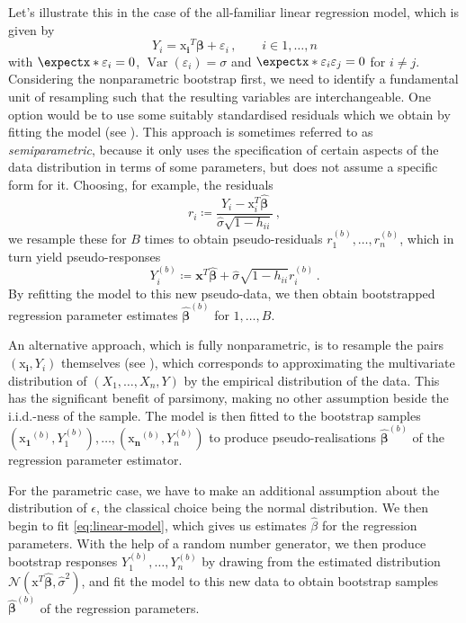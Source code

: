 \documentclass[a4paper]{book}
\begin{document}
Let's illustrate this in the case of the all-familiar linear regression model, which is given by
\begin{equation} \label{eq:linear-model}
    Y_i = \bm{\mathrm{x}_i}^T \bm{\beta} + \varepsilon_i \,, \qquad i \in {1, \dots, n}
\end{equation}
with $\expect{\varepsilon_i} = 0$, $\operatorname{Var}(\varepsilon_i) = \sigma$ and $\expect{\varepsilon_i \varepsilon_j} = 0$ for $i \neq j$. Considering the nonparametric bootstrap first, we need to identify a fundamental unit of resampling such that the resulting variables are interchangeable. One option would be to use some suitably standardised residuals which we obtain by fitting the model (see \cite[Algorithm 6.1]{davison}). This approach is sometimes referred to as \emph{semiparametric}, because it only uses the specification of certain aspects of the data distribution in terms of some parameters, but does not assume a specific form for it. Choosing, for example, the residuals
\begin{equation}
    r_i \coloneqq \frac{Y_i - \bm{\mathrm{x}}^T_i \widehat{\bm{\beta}}}{\widehat{\sigma} \sqrt{1 - h_{ii}}} \,,
\end{equation}
we resample these for $B$ times to obtain pseudo-residuals $r^{(b)}_1, \dots, r^{(b)}_n$, which in turn yield  pseudo-responses
\begin{equation}
    Y_i^{(b)} \coloneqq \mathbf{x}^T \widehat{\bm{\beta}} + \widehat{\sigma} \sqrt{1 - h_{ii}} r^{(b)}_i \,.
\end{equation}
By refitting the model to this new pseudo-data, we then obtain bootstrapped regression parameter estimates $\widehat{\bm{\beta}}^{(b)}$ for $1, \dots, B$. 

An alternative approach, which is fully nonparametric, is to resample the pairs $(\bm{\mathrm{x}_i}, Y_i)$ themselves (see \cites[Section 9.5]{efron:intro}[Algorithm 6.2]{davison}), which corresponds to approximating the multivariate distribution of $(X_1, \dots, X_n, Y)$ by the empirical distribution of the data. This has the significant benefit of parsimony, making no other assumption beside the i.i.d.-ness of the sample. The model is then fitted to the bootstrap samples $(\bm{\mathrm{x}_1}^{(b)}, Y^{(b)}_1), \dots, (\bm{\mathrm{x}_n}^{(b)}, Y^{(b)}_n)$ to produce pseudo-realisations $\widehat{\bm{\beta}}^{(b)}$ of the regression parameter estimator.

For the parametric case, we have to make an additional assumption about the distribution of $\epsilon$, the classical choice being the normal distribution. We then begin to fit \cref{eq:linear-model}, which gives us estimates $\widehat{\beta}$ for the regression parameters. With the help of a random number generator, we then produce bootstrap responses $Y^{(b)}_1, \dots, Y^{(b)}_n$ by drawing from the estimated distribution $\mathcal{N}(\bm{\mathrm{x}}^T \widehat{\bm{\beta}}, \widehat{\sigma}^2)$, and fit the model to this new data to obtain bootstrap samples $\widehat{\bm{\beta}}^{(b)}$ of the regression parameters.
\end{document}
